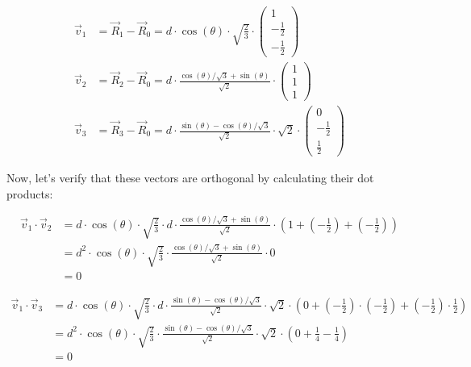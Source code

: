 \begin{align}
\vec{v}_1 &= \vec{R}_1 - \vec{R}_0 = d \cdot \cos(\theta) \cdot \sqrt{\frac{2}{3}} \cdot \begin{pmatrix} 1 \\ -\frac{1}{2} \\ -\frac{1}{2} \end{pmatrix} \\
\vec{v}_2 &= \vec{R}_2 - \vec{R}_0 = d \cdot \frac{\cos(\theta)/\sqrt{3} + \sin(\theta)}{\sqrt{2}} \cdot \begin{pmatrix} 1 \\ 1 \\ 1 \end{pmatrix} \\
\vec{v}_3 &= \vec{R}_3 - \vec{R}_0 = d \cdot \frac{\sin(\theta) - \cos(\theta)/\sqrt{3}}{\sqrt{2}} \cdot \sqrt{2} \cdot \begin{pmatrix} 0 \\ -\frac{1}{2} \\ \frac{1}{2} \end{pmatrix}
\end{align}

Now, let's verify that these vectors are orthogonal by calculating their dot products:

\begin{align}
\vec{v}_1 \cdot \vec{v}_2 &= d \cdot \cos(\theta) \cdot \sqrt{\frac{2}{3}} \cdot d \cdot \frac{\cos(\theta)/\sqrt{3} + \sin(\theta)}{\sqrt{2}} \cdot \left(1 + \left(-\frac{1}{2}\right) + \left(-\frac{1}{2}\right)\right) \\
&= d^2 \cdot \cos(\theta) \cdot \sqrt{\frac{2}{3}} \cdot \frac{\cos(\theta)/\sqrt{3} + \sin(\theta)}{\sqrt{2}} \cdot 0 \\
&= 0
\end{align}

\begin{align}
\vec{v}_1 \cdot \vec{v}_3 &= d \cdot \cos(\theta) \cdot \sqrt{\frac{2}{3}} \cdot d \cdot \frac{\sin(\theta) - \cos(\theta)/\sqrt{3}}{\sqrt{2}} \cdot \sqrt{2} \cdot \left(0 + \left(-\frac{1}{2}\right) \cdot \left(-\frac{1}{2}\right) + \left(-\frac{1}{2}\right) \cdot \frac{1}{2}\right) \\
&= d^2 \cdot \cos(\theta) \cdot \sqrt{\frac{2}{3}} \cdot \frac{\sin(\theta) - \cos(\theta)/\sqrt{3}}{\sqrt{2}} \cdot \sqrt{2} \cdot \left(0 + \frac{1}{4} - \frac{1}{4}\right) \\
&= 0
\end{align}

